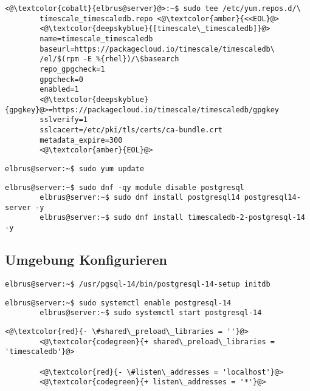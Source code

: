\documentclass{article}
\begin{document}
	\lstset{style=commands}
	\begin{lstlisting}[caption={Erstellen und berarbeiten des Timescale repository.},keywords={name, baseurl, repo\_gpgcheck, enabled, sslverify, sslcacert, metadata\_expire}, keywordstyle=\color{deepskyblue}]
		<@\textcolor{cobalt}{elbrus@server}@>:~$ sudo tee /etc/yum.repos.d/\ 
		timescale_timescaledb.repo <@\textcolor{amber}{<<EOL}@>
		<@\textcolor{deepskyblue}{[timescale\_timescaledb]}@>
		name=timescale_timescaledb
		baseurl=https://packagecloud.io/timescale/timescaledb\
		/el/$(rpm -E %{rhel})/\$basearch
		repo_gpgcheck=1
		gpgcheck=0
		enabled=1
		<@\textcolor{deepskyblue}{gpgkey}@>=https://packagecloud.io/timescale/timescaledb/gpgkey
		sslverify=1
		sslcacert=/etc/pki/tls/certs/ca-bundle.crt
		metadata_expire=300
		<@\textcolor{amber}{EOL}@>
	\end{lstlisting}

	\lstset{style=commands}
	\begin{lstlisting}[caption={Updaten der lokalen Package-Liste.}]
		elbrus@server:~$ sudo yum update
	\end{lstlisting}

	\begin{lstlisting}[caption={Installieren von TimescaleDB}]
		elbrus@server:~$ sudo dnf -qy module disable postgresql
		elbrus@server:~$ sudo dnf install postgresql14 postgresql14-server -y
		elbrus@server:~$ sudo dnf install timescaledb-2-postgresql-14 -y
	\end{lstlisting}
	
	\newpage
	\subsection[TimescaleDB konfigurieren]{Umgebung Konfigurieren}
	\begin{lstlisting}[caption={Initialisieren der Datenbank.}]
		elbrus@server:~$ /usr/pgsql-14/bin/postgresql-14-setup initdb
	\end{lstlisting}
	
	\begin{lstlisting}[caption={Verknüpfen von 'postgresql' Serive Start mit Serverstart sowie den Service starten.}]
		elbrus@server:~$ sudo systemctl enable postgresql-14
		elbrus@server:~$ sudo systemctl start postgresql-14
	\end{lstlisting}

	\lstset{style=files}
	\begin{lstlisting}[caption={var/lib/pgsql/14/data/postgresql.conf - Ändern der folgenden Zeilen}, numbers=none]
		<@\textcolor{red}{- \#shared\_preload\_libraries = ''}@>
		<@\textcolor{codegreen}{+ shared\_preload\_libraries = 'timescaledb'}@>
		
		<@\textcolor{red}{- \#listen\_addresses = 'localhost'}@>
		<@\textcolor{codegreen}{+ listen\_addresses = '*'}@>
	\end{lstlisting}
	
\end{document}
